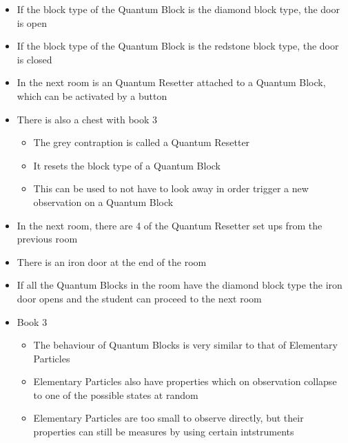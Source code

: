 \documentclass[11pt,twoside]{report} %
\begin{document}
\begin{itemize}
	\item If the block type of the Quantum Block is the diamond block type, the door is open
	\item If the block type of the Quantum Block is the redstone block type, the door is closed
	\item In the next room is an Quantum Resetter attached to a Quantum Block, which can be activated by a button
	\item There is also a chest with book 3
	\begin{itemize}
		\item The grey contraption is called a Quantum Resetter
		\item It resets the block type of a Quantum Block
		\item This can be used to not have to look away in order trigger a new observation on a Quantum Block
	\end{itemize}
	\item In the next room, there are 4 of the Quantum Resetter set ups from the previous room
	\item There is an iron door at the end of the room
	\item If all the Quantum Blocks in the room have the diamond block type the iron door opens and the student can proceed to the next room
	\item Book 3
	\begin{itemize}
		\item The behaviour of Quantum Blocks is very similar to that of Elementary Particles
		\item Elementary Particles also have properties which on observation collapse to one of the possible states at random
		\item Elementary Particles are too small to observe directly, but their properties can still be measures by using certain intstruments
	\end{itemize}
\end{itemize}
\end{document}

